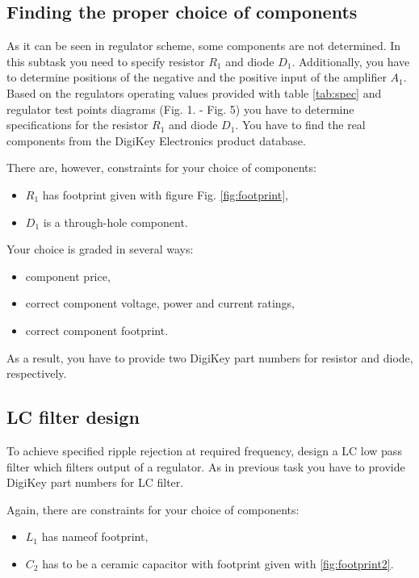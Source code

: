 \documentclass[a4paper]{article}
\begin{document}
\newpage

\subsection{Finding the proper choice of components}
\label{ele:task:1}
As it can be seen in regulator scheme, some components are not determined. In 
this subtask you need to specify resistor $R_1$ and diode $D_1$. Additionally, 
you have to determine positions of the negative and the positive input of the 
amplifier $A_1$. Based on the regulators operating values provided with table
\ref{tab:spec} and regulator test points diagrams (Fig. 1. - Fig. 5) you have 
to determine specifications for the resistor $R_1$ and diode $D_1$. You have to 
find the real components from the DigiKey Electronics product database. 

There are, however, constraints for your choice of components:
\begin{itemize}
\item $R_1$ has footprint given with figure Fig. \ref{fig:footprint},
\item $D_1$ is a through-hole component.
\end{itemize} 
 
Your choice is graded in several ways:
\begin{itemize}
\item component price,
\item correct component voltage, power and current ratings,
\item correct component footprint.
\end{itemize}
As a result, you have to provide two DigiKey part numbers for resistor and 
diode, respectively. 

\subsection{LC filter design}
\label{ele:task:2}
To achieve specified ripple rejection at required frequency, design a LC low 
pass filter which filters output of a regulator. As in previous task you have 
to provide DigiKey part numbers for LC filter. 

Again, there are constraints for your choice of components:
\begin{itemize}
\item $L_1$ has nameof footprint,
\item $C_2$ has to be a ceramic capacitor with footprint given with 
\ref{fig:footprint2}. 
\end{itemize}
\end{document}
